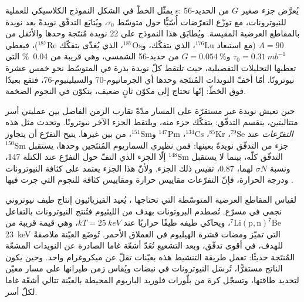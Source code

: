 يمثّل الخطّ في الشكل النموذج الكلاسيكي للعملية s: يُعرَّض جزء صغير
$G$ من الحديد-56 للنيوترونات، مع توزّع التعرّضات أُسّيًّا
حول متوسّط $\tau_0$، ويُتابَع التدفّق نويدةً بعد نويدة
بالمقاطع العرضية المقيسة. ويُطابَق هذا النموذج على \num{22} نويدة مُنتَجة  وحدها
والأثقل من $A = 90$ (مع استبعاد $^{176}\mathrm{Lu}$، الذي يتفكّك،
و$^{187}\mathrm{Os}$، الذي يُغذّى بتفكّك
$^{187}\mathrm{Re}$)، فيعطي $\tau_0 = \qty{0.31}{mb^{-1}}$
و$G = \qty{0.054}{\percent}$ من حديد-56 الشمسي، وهي قريبة من
\qty{0.04}{\percent} التي تعطيها التحليلات التفصيلية، حيث تلتقط كلّ نويدة بذرة
في المتوسّط نحو خمس عشرة نيوترونًا. أمّا أخفّ النويدات المُنتَجة  وحدها
أي الجرمانيوم-70 والسيلينيوم-76، فتقع بعيدًا فوق الخطّ: إنّها تحتاج إلى
مكوّن ثانٍ ضعيف، يتكوّن في النجوم الضخمة.

حين تعيش نويدة غير مستقرّة على المسار مدّةً تقارب الزمن الفاصل بين عمليتي أسر متتاليتين، ينقسم التدفّق:
يتفكّك جزء منه، ويلتقط الجزء الآخر نيوترونًا.
وتحدث مثل هذه \emph{التفرّعات} عند $^{79}\mathrm{Se}$، $^{85}\mathrm{Kr}$،
$^{134}\mathrm{Cs}$، $^{147}\mathrm{Pm}$ و$^{151}\mathrm{Sm}$، من بين
غيرها. يتيح التفرّع أن يتجاوز جزء من التدفّق نويدةً بعينها: فمن
نظيري السماريوم المُنتَجين  وحدها، يستقبل $^{150}\mathrm{Sm}$ التدفّق كلّه،
بينما لا يستقبل $^{148}\mathrm{Sm}$ إلّا الجزء الذي التفّ حول التفرّع
عند الكتلة 147، ونسبة $\sigma N$ لهما، \num{0.87}،
تقيس ذلك الجزء. ولأنّ هذا الجزء يعتمد على كثافة النيوترونات
ودرجة الحرارة، فإنّ التفرّعات مقاييس حرارة ومقاييس كثافة للنجوم
التي جرت فيها .

\begin{inthelab}
لقياس المقاطع العرضية المتوسّطة التي تحتاجها ،
يُعيد الفيزيائيون إنتاج طيف نيوتروني نجمي في مسرّع.
تُصطدم البروتونات بهدف من الليثيوم فتُنتج النيوترونات بالتفاعل
$^{7}\mathrm{Li}(\mathrm{p},\mathrm{n})^{7}\mathrm{Be}$، ويحاكي طيفه
طيفًا حراريًا عند $kT = \qty{25}{keV}$، وهي قيمة قريبة من
\qty{23}{keV} التي تميّز ومضات قشرة الهيليوم في العملاق الأحمر. تُوضَع العيّنة
ملاصقةً للهدف، في أقوى تدفّق، وبعد
التشعيع تُعَدّ أشعّة غاما الصادرة عن النويدات المشعّة المُنتَجة حديثًا:
تعمل طريقة التنشيط هذه بعيّنات تقلّ عن
ميكروغرام واحد. وحين يكون الناتج مستقرًّا، تُرسَل النيوترونات في نبضات
ويُقاس زمن طيرانها على مسار معيّن لتحديد طاقتها، وتسجّل كرة من
بلّورات فلوريد الباريوم المحيطة بالعيّنة تتالي أشعّة غاما
لكلّ أسر.
\end{inthelab}

